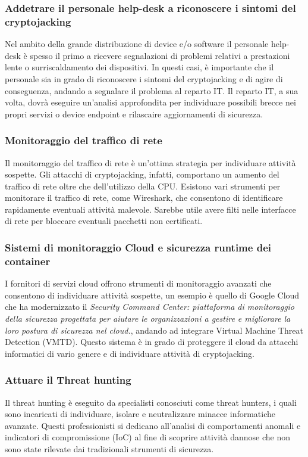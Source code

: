 \documentclass[12pt,a4paper]{article}
\begin{document}
\subsubsection*{Addetrare il personale help-desk a riconoscere i sintomi del cryptojacking}
Nel ambito della grande distribuzione di device e/o software il personale
help-desk è spesso il primo a ricevere segnalazioni di problemi relativi a
prestazioni lente o surriscaldamento dei dispositivi. In questi casi, è
importante che il personale sia in grado di riconoscere i sintomi del
cryptojacking e di agire di conseguenza, andando a segnalare il problema al
reparto IT. Il reparto IT, a sua volta, dovrà eseguire un'analisi approfondita
per individuare possibili brecce nei propri servizi o device endpoint e
rilascaire aggiornamenti di sicurezza.

\subsubsection*{Monitoraggio del traffico di rete}
Il monitoraggio del traffico di rete è un'ottima strategia per individuare
attività sospette. Gli attacchi di cryptojacking, infatti, comportano un aumento
del traffico di rete oltre che dell'utilizzo della CPU. Esistono vari strumenti
per monitorare il traffico di rete, come Wireshark, che consentono di
identificare rapidamente eventuali attività malevole. Sarebbe utile avere filti
nelle interfacce di rete per bloccare eventuali pacchetti non certificati. 

\subsubsection*{Sistemi di monitoraggio Cloud e sicurezza runtime dei container}
I fornitori di servizi cloud offrono strumenti di monitoraggio avanzati che
consentono di individuare attività sospette, un esempio è quello di Google Cloud
che ha modernizzato il \textit{Security Command Center: piattaforma di
monitoraggio della sicurezza progettata per aiutare le organizzazioni a gestire
e migliorare la loro postura di sicurezza nel cloud.}, andando ad integrare
Virtual Machine Threat Detection (VMTD). Questo sistema è in grado di proteggere
il cloud da attacchi informatici di vario genere e di individuare attività di
cryptojacking.

\subsubsection*{Attuare il Threat hunting}
Il threat hunting è eseguito da specialisti conosciuti come threat hunters, i
quali sono incaricati di individuare, isolare e neutralizzare minacce
informatiche avanzate. Questi professionisti si dedicano all'analisi di
comportamenti anomali e indicatori di compromissione (IoC) al fine di scoprire
attività dannose che non sono state rilevate dai tradizionali strumenti di
sicurezza.
\end{document}
